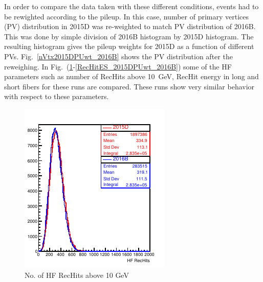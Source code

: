 In order to compare the data taken with these different conditions, events had to be rewighted according to the pileup. In this case, number of primary vertices (PV) distribution in 2015D was re-weighted to match PV distribution of 2016B. This was done by simple division of 2016B histogram by 2015D histogram. The resulting histogram gives the pileup weights for 2015D as a function of different PVs. Fig.~\ref{nVtx2015DPUwt_2016B} shows the PV distribution after the reweighing. 
In Fig.~(\ref{nRecHits_2015DPUwt_2016B}-\ref{RecHitES_2015DPUwt_2016B}) some of the HF parameters such as number of RecHits above 10~GeV, RecHit energy in long and short fibers for these runs are compared. These runs show very similar behavior with respect to these parameters.
\begin{figure}[!h]
\begin{minipage}[b]{0.48\linewidth}
\centering
\includegraphics[width=0.9\linewidth]{../Figures/Chap2/ImageFiles_HF/BasicPics/Comp2015vs2016B/nRecHits_2015DPUwt_2016B.pdf}
\captionsetup{width=.9\linewidth}
\caption{No. of HF RecHits above 10 GeV}
\label{nRecHits_2015DPUwt_2016B}
\end{minipage}
\begin{minipage}[b]{0.48\linewidth}
\centering

\end{minipage}
\end{figure}
